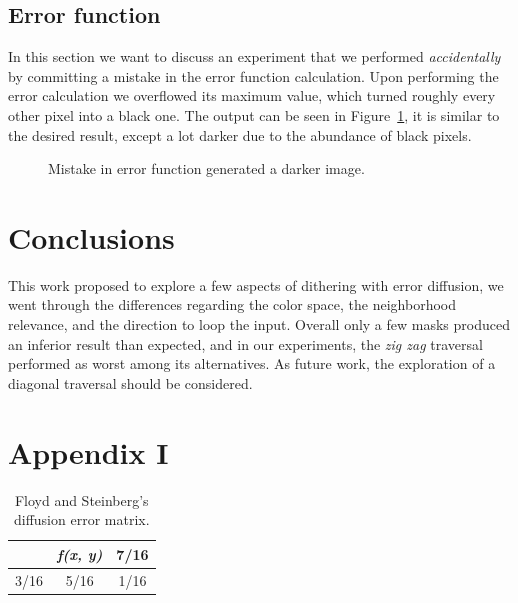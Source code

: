 \documentclass[conference]{IEEEtran}
\begin{document}
\subsection{Error function}
In this section we want to discuss an experiment that we performed \textit{accidentally} by committing a mistake in the error function calculation. Upon performing the error calculation we overflowed its maximum value, which turned roughly every other pixel into a black one. The output can be seen in Figure~\ref{fig:error}, it is similar to the desired result, except a lot darker due to the abundance of black pixels.
\begin{figure}[htbp]
	\centering
	\caption{Mistake in error function generated a darker image.}
	\label{fig:error}
\end{figure}
\section{Conclusions}
This work proposed to explore a few aspects of dithering with error diffusion, we went through the differences regarding the color space, the neighborhood relevance, and the direction to loop the input. Overall only a few masks produced an inferior result than expected, and in our experiments, the \textit{zig zag} traversal performed as worst among its alternatives. As future work, the exploration of a diagonal traversal should be considered.
\pagebreak
\section{Appendix I}
\label{sec:appendix1}

\begin{table}[!h]
\centering
\renewcommand{\arraystretch}{1.5}
\begin{tabular}{c|c|c}
     & \textit{f(x, y)} & 7/16 \\ \hline
3/16 & 5/16             & 1/16
\end{tabular}
\caption{Floyd and Steinberg's diffusion error matrix.}
\label{tab:flo}
\end{table}
\end{document}
